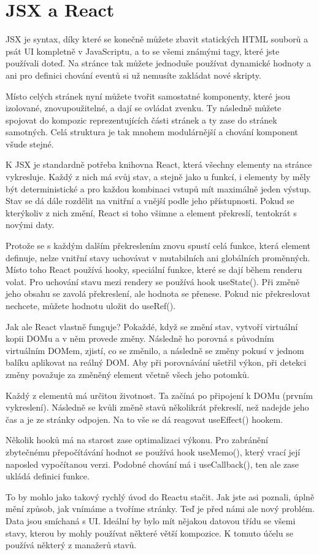 \section{JSX a React}

JSX je syntax, díky které se konečně můžete zbavit statických HTML souborů a psát UI kompletně v JavaScriptu, a to se všemi známými tagy, které jste používali doteď.\cite{JSX} Na stránce tak můžete jednoduše používat dynamické hodnoty a ani pro definici chování eventů si už nemusíte zakládat nové skripty.

Místo celých stránek nyní můžete tvořit samostatné komponenty, které jsou izolované, znovupoužitelné, a dají se ovládat zvenku. Ty následně můžete spojovat do kompozic reprezentujících části stránek a ty zase do stránek samotných. Celá struktura je tak mnohem modulárnější a chování komponent všude stejné.

K JSX je standardně potřeba knihovna React, která všechny elementy na stránce vykresluje. Každý z nich má svůj stav, a stejně jako u funkcí, i elementy by měly být deterministické a pro každou kombinaci vstupů mít maximálně jeden výstup. Stav se dá dále rozdělit na vnitřní a vnější podle jeho přístupnosti. Pokud se kterýkoliv z nich změní, React si toho všimne a element překreslí, tentokrát s novými daty.

Protože se s každým dalším překreslením znovu spustí celá funkce, která element definuje, nelze vnitřní stavy uchovávat v mutabilních ani globálních proměnných.\cite{ReactState} Místo toho React používá hooky, speciální funkce, které se dají během renderu volat. Pro uchování stavu mezi rendery se používá hook useState(). Při změně jeho obsahu se zavolá překreslení, ale hodnota se přenese. Pokud nic překreslovat nechcete, můžete hodnotu uložit do useRef()\cite{UseRef}.

Jak ale React vlastně funguje?\cite{ReactDeepDive} Pokaždé, když se změní stav, vytvoří virtuální kopii DOMu a v něm provede změny.\cite{VirtualDOM} Následně ho porovná s původním virtuálním DOMem, zjistí, co se změnilo, a následně se změny pokusí v jednom balíku aplikovat na reálný DOM. Aby při porovnávání ušetřil výkon, při detekci změny považuje za změněný element včetně všech jeho potomků.

Každý z elementů má určitou životnost. Ta začíná po připojení k DOMu (prvním vykreslení). Následně se kvůli změně stavů několikrát překreslí, než nadejde jeho čas a je ze stránky odpojen. Na to vše se dá reagovat useEffect() hookem.

Několik hooků má na starost zase optimalizaci výkonu. Pro zabránění zbytečnému přepočítávání hodnot se používá hook useMemo(), který vrací její naposled vypočítanou verzi. Podobné chování má i useCallback(), ten ale zase ukládá definici funkce.

To by mohlo jako takový rychlý úvod do Reactu stačit. Jak jste asi poznali, úplně mění způsob, jak vnímáme a tvoříme stránky. Teď je před námi ale nový problém. Data jsou smíchaná s UI. Ideální by bylo mít nějakou datovou třídu se všemi stavy, kterou by mohly používat některé větší kompozice. K tomuto účelu se používá některý z manažerů stavů.